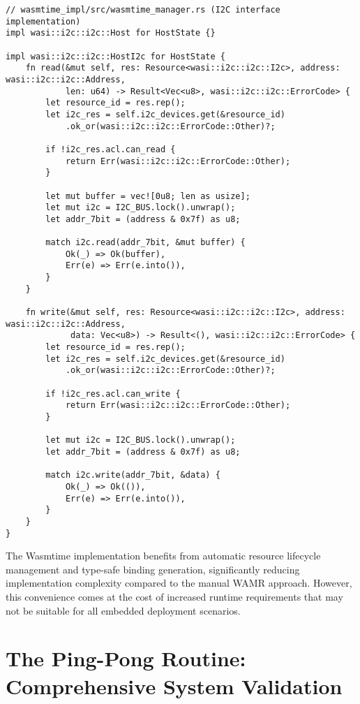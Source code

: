 \begin{verbatim}
// wasmtime_impl/src/wasmtime_manager.rs (I2C interface implementation)
impl wasi::i2c::i2c::Host for HostState {}

impl wasi::i2c::i2c::HostI2c for HostState {
    fn read(&mut self, res: Resource<wasi::i2c::i2c::I2c>, address: wasi::i2c::i2c::Address,
            len: u64) -> Result<Vec<u8>, wasi::i2c::i2c::ErrorCode> {
        let resource_id = res.rep();
        let i2c_res = self.i2c_devices.get(&resource_id)
            .ok_or(wasi::i2c::i2c::ErrorCode::Other)?;

        if !i2c_res.acl.can_read {
            return Err(wasi::i2c::i2c::ErrorCode::Other);
        }

        let mut buffer = vec![0u8; len as usize];
        let mut i2c = I2C_BUS.lock().unwrap();
        let addr_7bit = (address & 0x7f) as u8;

        match i2c.read(addr_7bit, &mut buffer) {
            Ok(_) => Ok(buffer),
            Err(e) => Err(e.into()),
        }
    }

    fn write(&mut self, res: Resource<wasi::i2c::i2c::I2c>, address: wasi::i2c::i2c::Address,
             data: Vec<u8>) -> Result<(), wasi::i2c::i2c::ErrorCode> {
        let resource_id = res.rep();
        let i2c_res = self.i2c_devices.get(&resource_id)
            .ok_or(wasi::i2c::i2c::ErrorCode::Other)?;

        if !i2c_res.acl.can_write {
            return Err(wasi::i2c::i2c::ErrorCode::Other);
        }

        let mut i2c = I2C_BUS.lock().unwrap();
        let addr_7bit = (address & 0x7f) as u8;

        match i2c.write(addr_7bit, &data) {
            Ok(_) => Ok(()),
            Err(e) => Err(e.into()),
        }
    }
}
\end{verbatim}

The Wasmtime implementation benefits from automatic resource lifecycle management and type-safe binding generation, significantly reducing implementation complexity compared to the manual WAMR approach. However, this convenience comes at the cost of increased runtime requirements that may not be suitable for all embedded deployment scenarios.

\section{The Ping-Pong Routine: Comprehensive System Validation}
\label{sec:ping-pong-routine}

